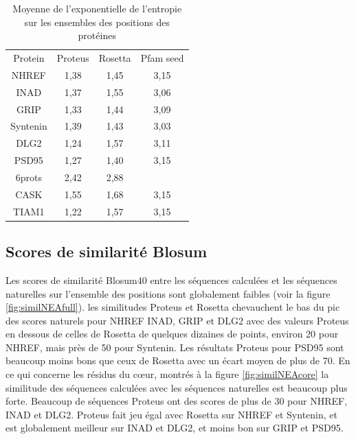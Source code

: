     \begin{table}[!htbp]
      \centering
      \caption{Moyenne de l'exponentielle de l'entropie sur les ensembles des positions des protéines}
      \label{tab:Entropie_PDZ}      
      \begin{tabular}{cccc}
        \toprule
        Protein & Proteus & Rosetta & Pfam seed \\
        \cmidrule{1-4}
        NHREF  & 1,38 & 1,45 & 3,15  \\
        INAD  & 1,37 & 1,55 & 3,06  \\
        GRIP  & 1,33 & 1,44 & 3,09  \\
        Syntenin  & 1,39 & 1,43 & 3,03  \\
        DLG2  & 1,24 & 1,57 & 3,11  \\
        PSD95  & 1,27 & 1,40 & 3,15  \\
        6prots & 2,42  & 2,88 &    \\
        \cmidrule{1-4}
        CASK  & 1,55 & 1,68 & 3,15  \\
        TIAM1 & 1,22 & 1,57 & 3,15  \\
        \bottomrule
      \end{tabular}      
    \end{table}
        
\subsection{Scores de similarité Blosum}

Les scores de similarité Blosum40 entre les séquences calculées et les séquences naturelles sur l'ensemble des positions sont globalement faibles (voir la figure \ref{fig:similNEAfull}). les similitudes Proteus et Rosetta chevauchent le bas du pic des scores naturels pour NHREF INAD, GRIP et DLG2 avec des valeurs Proteus en dessous de celles de Rosetta de quelques dizaines de points, environ 20 pour NHREF, mais près de 50 pour Syntenin. Les résultats Proteus pour PSD95 sont beaucoup moins bons que ceux de Rosetta avec un écart moyen de plus de 70. En ce qui concerne les résidus du cœur, montrés à la figure  \ref{fig:similNEAcore} la similitude des séquences calculées avec les séquences naturelles est beaucoup plus forte. Beaucoup de séquences Proteus ont des scores de plus de 30 pour NHREF, INAD et DLG2. Proteus fait jeu égal avec Rosetta sur NHREF et Syntenin, et est globalement meilleur sur INAD et DLG2, et moins bon sur GRIP et PSD95. 


